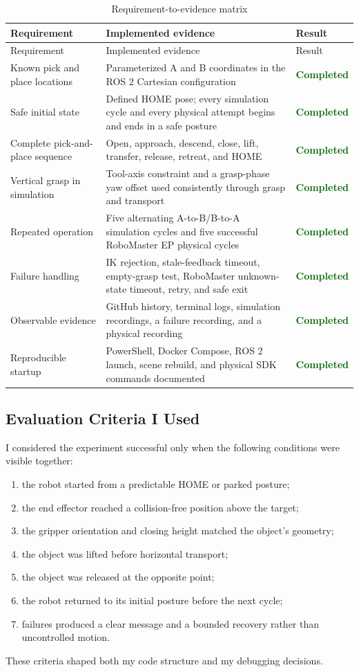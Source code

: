 \documentclass[UTF8,zihao=-4,scheme=chinese,fontset=none]{ctexart}
\newcommand{\completed}{\textcolor{darkgreen}{\textbf{Completed}}}
\begin{document}
\begin{longtable}{p{4.0cm}p{7.1cm}p{2.0cm}}
\caption{Requirement-to-evidence matrix}\label{tab:reqmatrix}\\
\toprule Requirement & Implemented evidence & Result\\
\midrule\endfirsthead
\toprule Requirement & Implemented evidence & Result\\
\midrule\endhead
Known pick and place locations & Parameterized A and B coordinates in the ROS 2 Cartesian configuration & \completed\\
Safe initial state & Defined HOME pose; every simulation cycle and every physical attempt begins and ends in a safe posture & \completed\\
Complete pick-and-place sequence & Open, approach, descend, close, lift, transfer, release, retreat, and HOME & \completed\\
Vertical grasp in simulation & Tool-axis constraint and a grasp-phase yaw offset used consistently through grasp and transport & \completed\\
Repeated operation & Five alternating A-to-B/B-to-A simulation cycles and five successful RoboMaster EP physical cycles & \completed\\
Failure handling & IK rejection, stale-feedback timeout, empty-grasp test, RoboMaster unknown-state timeout, retry, and safe exit & \completed\\
Observable evidence & GitHub history, terminal logs, simulation recordings, a failure recording, and a physical recording & \completed\\
Reproducible startup & PowerShell, Docker Compose, ROS 2 launch, scene rebuild, and physical SDK commands documented & \completed\\
\bottomrule
\end{longtable}

\subsection{Evaluation Criteria I Used}

I considered the experiment successful only when the following conditions were visible together:
\begin{enumerate}
\item the robot started from a predictable HOME or parked posture;
\item the end effector reached a collision-free position above the target;
\item the gripper orientation and closing height matched the object's geometry;
\item the object was lifted before horizontal transport;
\item the object was released at the opposite point;
\item the robot returned to its initial posture before the next cycle;
\item failures produced a clear message and a bounded recovery rather than uncontrolled motion.
\end{enumerate}
These criteria shaped both my code structure and my debugging decisions.
\end{document}
